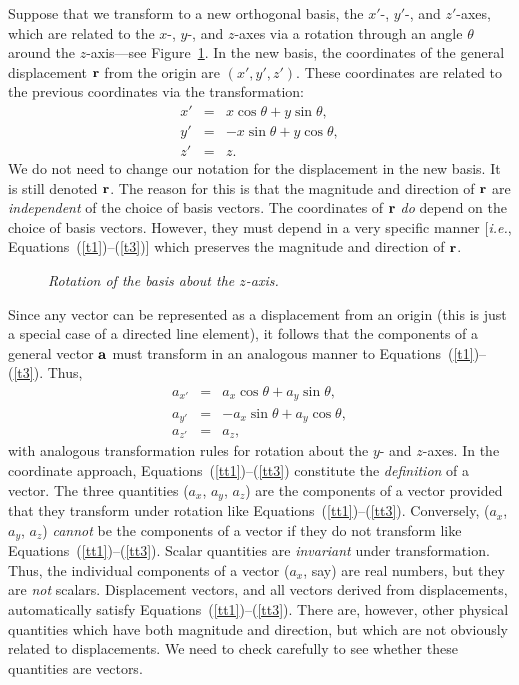 Suppose that we transform to a new orthogonal basis, the $x'$-, $y'$-, and $z'$-axes,
which are related to the $x$-, $y$-, and $z$-axes via  a rotation through an angle
$\theta$ around the $z$-axis---see Figure~\ref{f3}.
In the new basis, the coordinates of the general displacement ${\bf r}$ from the
origin are $(x', y', z')$. These coordinates are related to the previous
coordinates via the transformation:
\begin{eqnarray}
x' &=& x\cos\theta + y\sin \theta,\label{t1}\\[0.5ex]
y' &=& -x\sin\theta + y\cos\theta,\\[0.5ex]
z' &=& z.\label{t3}
\end{eqnarray}
We do not need to change our notation for the displacement in the new basis.
It is still denoted ${\bf r}$. The reason for this is that the magnitude and
direction of ${\bf r}$ are {\em independent} of the choice of basis vectors. The
coordinates of ${\bf r}$ {\em do}\/ depend on the choice of basis vectors.
However, they must depend in a very specific manner [{\em i.e.}, Equations~(\ref{t1})--(\ref{t3})] which
preserves the magnitude and direction of ${\bf r}$.
\begin{figure}
\epsfysize=1.5in
\centerline{}
\caption{\em Rotation of the basis about the $z$-axis.}\label{f3}
\end{figure}


Since any vector can be represented as a displacement from an origin
(this is just a special case of a directed line element), it follows that
the 
components of a general vector ${\bf a}$ must transform in an analogous
manner to Equations~(\ref{t1})--(\ref{t3}). Thus,
\begin{eqnarray}
a_{x'} &=& a_x\cos\theta + a_y\sin \theta,\label{tt1}\\[0.5ex]
a_{y'} &=& -a_x\sin\theta + a_y\cos\theta,\\[0.5ex]
a_{z'} &=& a_z,\label{tt3}
\end{eqnarray}
with analogous transformation rules for rotation about the $y$- and $z$-axes.
In the coordinate approach, Equations~(\ref{tt1})--(\ref{tt3}) constitute the {\em definition} of a vector.
 The three
quantities ($a_x$, $a_y$, $a_z$) are the components of a vector provided that
they transform under rotation like Equations~(\ref{tt1})--(\ref{tt3}). 
Conversely, ($a_x$, $a_y$, $a_z$) {\em cannot} be the components of a vector if they
do not transform like Equations~(\ref{tt1})--(\ref{tt3}). Scalar quantities are {\em invariant}
 under transformation.
Thus, the individual components of a vector ($a_x$, say) are real numbers, but 
they are
{\em not} scalars.
Displacement vectors, and all vectors derived from
displacements, automatically satisfy Equations~(\ref{tt1})--(\ref{tt3}). There are, however, other
physical quantities which have both magnitude and direction, but which are not
obviously related to displacements. We need to check carefully to see whether these
quantities are vectors. 

